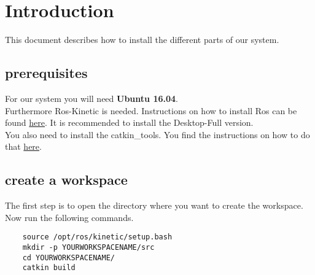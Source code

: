 \documentclass[main.tex]{subfiles}
\begin{document}
\newpage
	\section{Introduction}
	This document describes how to install the different parts of our system.
	
	\subsection{prerequisites}
	
	For our system you will need \textbf{Ubuntu 16.04}.\\
	Furthermore Ros-Kinetic is needed. Instructions on how to install Ros can be found \href{http://wiki.ros.org/kinetic/Installation/Ubuntu}{here}. It is recommended to install the Desktop-Full version.\\
	You also need to install the catkin\_tools. You find the instructions on how to do that \href{https://catkin-tools.readthedocs.io/en/latest/installing.html}{here}.\\
	\subsection{create a workspace}
	The first step is to open the directory where you want to create the workspace.\\
	Now run the following commands.
	\begin{lstlisting}
	source /opt/ros/kinetic/setup.bash
	mkdir -p YOURWORKSPACENAME/src
	cd YOURWORKSPACENAME/
	catkin build 
	\end{lstlisting}
	
\end{document}
